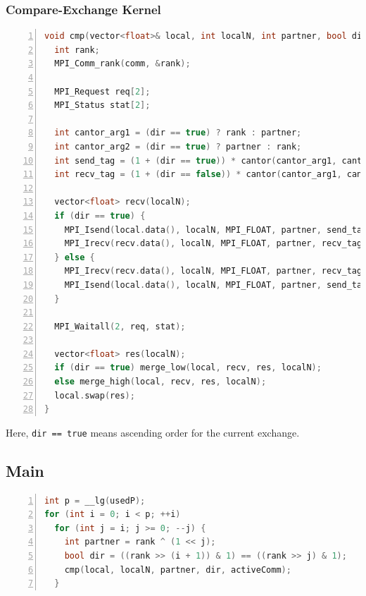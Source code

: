 \documentclass{article}
\begin{document}
\subsubsection*{Compare-Exchange Kernel}
\begin{lstlisting}[language=C++, basicstyle=\ttfamily\small, keywordstyle=\color{blue}\bfseries, commentstyle=\color{gray}\itshape, stringstyle=\color{red}, numbers=left, numberstyle=\tiny\color{gray}, stepnumber=1, frame=single, showstringspaces=false, breaklines=true]
void cmp(vector<float>& local, int localN, int partner, bool dir, MPI_Comm comm) {
  int rank;
  MPI_Comm_rank(comm, &rank);

  MPI_Request req[2];
  MPI_Status stat[2];

  int cantor_arg1 = (dir == true) ? rank : partner;
  int cantor_arg2 = (dir == true) ? partner : rank;
  int send_tag = (1 + (dir == true)) * cantor(cantor_arg1, cantor_arg2);
  int recv_tag = (1 + (dir == false)) * cantor(cantor_arg1, cantor_arg2);

  vector<float> recv(localN);
  if (dir == true) {
    MPI_Isend(local.data(), localN, MPI_FLOAT, partner, send_tag, comm, &req[0]);
    MPI_Irecv(recv.data(), localN, MPI_FLOAT, partner, recv_tag, comm, &req[1]);
  } else {
    MPI_Irecv(recv.data(), localN, MPI_FLOAT, partner, recv_tag, comm, &req[0]);
    MPI_Isend(local.data(), localN, MPI_FLOAT, partner, send_tag, comm, &req[1]);
  }

  MPI_Waitall(2, req, stat);

  vector<float> res(localN);
  if (dir == true) merge_low(local, recv, res, localN);
  else merge_high(local, recv, res, localN);
  local.swap(res);
}
\end{lstlisting}

Here, \texttt{dir == true} means ascending order for the current exchange.

\subsection*{Main}
\begin{lstlisting}[language=C++, basicstyle=\ttfamily\small, keywordstyle=\color{blue}\bfseries, commentstyle=\color{gray}\itshape, stringstyle=\color{red}, numbers=left, numberstyle=\tiny\color{gray}, stepnumber=1, frame=single, showstringspaces=false, breaklines=true]
int p = __lg(usedP);
for (int i = 0; i < p; ++i)
  for (int j = i; j >= 0; --j) {
    int partner = rank ^ (1 << j);
    bool dir = ((rank >> (i + 1)) & 1) == ((rank >> j) & 1);
    cmp(local, localN, partner, dir, activeComm);
  }
\end{lstlisting}
\end{document}
